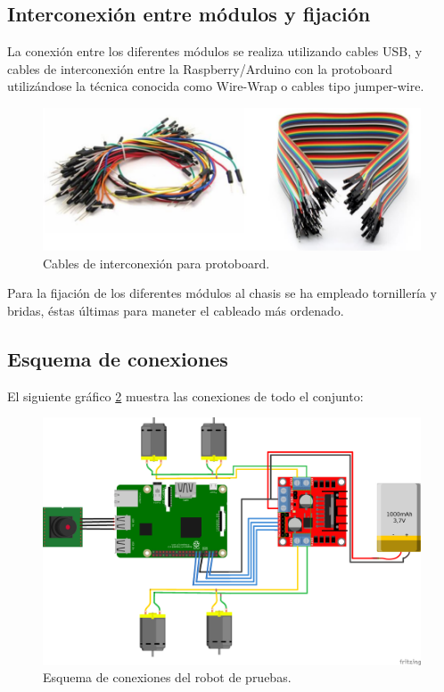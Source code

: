 \subsection{Interconexión entre módulos y fijación}

La conexión entre los diferentes módulos se realiza utilizando cables USB, y cables de interconexión entre la Raspberry/Arduino con la protoboard utilizándose la técnica
conocida como Wire-Wrap o cables tipo jumper-wire.\\

\begin{figure}[H]
  \begin{center}
    \includegraphics[scale=0.3]{imagenes/cables_interconexion.png}
  \end{center}
  \caption{Cables de interconexión para protoboard.}
  \label{figura:cables_interconexion}
\end{figure}

Para la fijación de los diferentes módulos al chasis se ha empleado tornillería y bridas, éstas últimas para maneter el cableado más ordenado.\\

\subsection{Esquema de conexiones}

El siguiente gráfico \ref{diagrama:esquema-conexiones} muestra las conexiones de todo el conjunto:

\begin{figure}[H]
  \includegraphics[scale=0.55]{imagenes/robot/robot-esquema2.png}
  \caption{Esquema de conexiones del robot de pruebas.}
  \label{diagrama:esquema-conexiones}
\end{figure}

